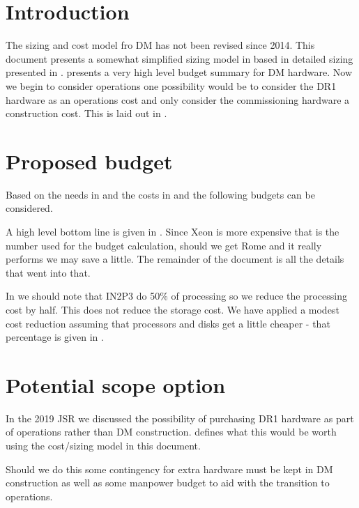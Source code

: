 \section{Introduction}
The sizing and cost model fro DM has not been revised since 2014. This document presents
a somewhat simplified sizing model in  based in detailed sizing presented in .
 presents a very high level budget summary for
DM hardware.
Now we begin to consider operations one possibility would be to consider the DR1 hardware
as an operations cost and only consider the commissioning hardware a construction cost.
This is laid out in .

\section{Proposed budget}\label{sec:cost}
Based on the needs in  and the costs in  and 
the following budgets can be considered.

A high level bottom line is given in .
Since Xeon is more expensive that is the number used for the budget calculation, should we get Rome and it really performs we may save a little.
The remainder of the document is all the details that went into that.



In  we should note that IN2P3 do 50\% of processing so we reduce the processing cost by half. This does not
reduce the storage cost. We have applied a modest cost reduction assuming that processors  and disks get a little cheaper - that
percentage is given in .

\section{Potential scope option} \label{sec:scope}
In the 2019 JSR we discussed the possibility of purchasing DR1 hardware as part of operations
rather than DM construction. 
defines what this would be worth using the cost/sizing model in this document.



Should we do this some contingency for extra hardware must be kept in DM construction as well as some manpower
budget to aid with the transition to operations.

